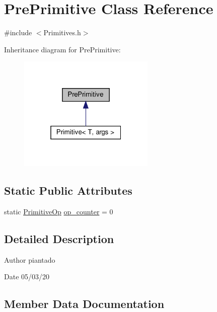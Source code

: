 \hypertarget{struct_pre_primitive}{}\section{Pre\+Primitive Class Reference}
\label{struct_pre_primitive}


{\ttfamily \#include $<$Primitives.\+h$>$}



Inheritance diagram for Pre\+Primitive\+:\nopagebreak
\begin{figure}[H]
\begin{center}
\leavevmode
\includegraphics[width=184pt]{struct_pre_primitive__inherit__graph}
\end{center}
\end{figure}
\subsection*{Static Public Attributes}
\begin{DoxyCompactItemize}
\item 
static \hyperlink{_instruction_8h_a227278394efd1e2313c727102db09ea9}{Primitive\+Op} \hyperlink{struct_pre_primitive_a8f4088dc0a3fe00fd81c509bb0af1881}{op\+\_\+counter} = 0
\end{DoxyCompactItemize}


\subsection{Detailed Description}
\begin{DoxyAuthor}{Author}
piantado 
\end{DoxyAuthor}
\begin{DoxyDate}{Date}
05/03/20 
\end{DoxyDate}


\subsection{Member Data Documentation}
\mbox{\label{struct_pre_primitive_a8f4088dc0a3fe00fd81c509bb0af1881}} 

